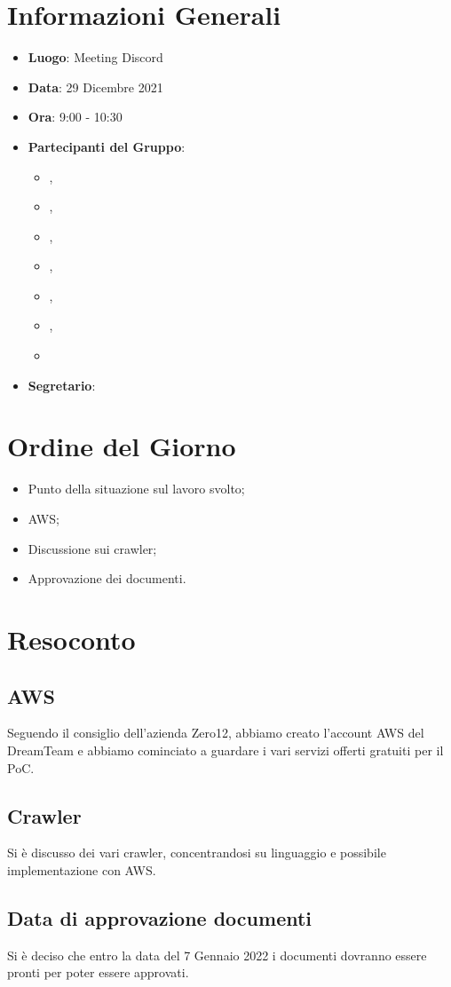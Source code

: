 \section{Informazioni Generali}

\begin{itemize}
\item{\textbf{Luogo}}: Meeting Discord
\item{\textbf{Data}}: 29 Dicembre 2021
\item{\textbf{Ora}}: 9:00 - 10:30
\item{\textbf{Partecipanti del Gruppo}}: 
	\begin{itemize}
	\item{\EP{},} 
	\item{\FP{},}
	\item{\GC{},}
	\item{\LW{},}
	\item{\MB{},}
	\item{\MG{},}
	\item{\PV{}}
	\end{itemize} 
\item{\textbf{Segretario}}: \PV{}	
\end{itemize}

\section{Ordine del Giorno}
\begin{itemize}
\item{Punto della situazione sul lavoro svolto;}
\item{AWS;}
\item{Discussione sui crawler;}
\item{Approvazione dei documenti.}
\end{itemize}

\section{Resoconto}

\subsection{AWS}
Seguendo il consiglio dell'azienda Zero12, abbiamo creato l'account AWS del DreamTeam e abbiamo cominciato a guardare i vari servizi offerti gratuiti per il PoC.

\subsection{Crawler}
Si è discusso dei vari crawler, concentrandosi su linguaggio e possibile implementazione con AWS.

\subsection{Data di approvazione documenti}
Si è deciso che entro la data del 7 Gennaio 2022 i documenti dovranno essere pronti per poter essere approvati.
